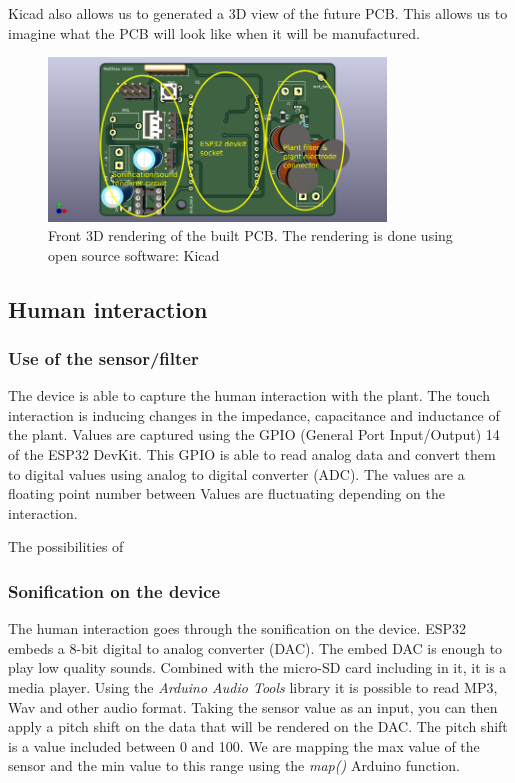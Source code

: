 Kicad also allows us to generated a 3D view of the future PCB. This allows us to imagine what the
PCB will look like when it will be manufactured.
\begin{figure}[h!]
    \centering
    \includegraphics[width=0.8\textwidth]{images/front_iop_3D_view_modified.png}
    \caption{Front 3D rendering of the built PCB. The rendering is done using open source software: Kicad} 
    \vspace{0.1cm}
    \label{fig:front_iop_3D_view_modified}
\end{figure}

\subsection{Human interaction}

\subsubsection{Use of the sensor/filter}

The device is able to capture the human interaction with the plant. The touch interaction is inducing changes
in the impedance, capacitance and inductance of the plant. Values are captured using the GPIO (General Port Input/Output)
14 of the ESP32 DevKit. This GPIO is able to read analog data and convert them to digital values using analog to digital
converter (ADC). The values are a floating point number between %
Values are fluctuating depending on the interaction. 


The possibilities of 


\subsubsection{Sonification on the device} %

The human interaction goes through the sonification on the device. ESP32 embeds a 8-bit digital to analog converter (DAC).
The embed DAC is enough to play low quality sounds. Combined with the micro-SD card including in it, it is a media player.
Using the \textit{Arduino Audio Tools} library it is possible to read MP3, Wav and other audio format.
Taking the sensor value as an input, you can then apply a pitch shift on the data that will be rendered on the DAC.
The pitch shift is a value included between 0 and 100. We are mapping the max value of the sensor and the min value
to this range using the \textit{map()} Arduino function.

